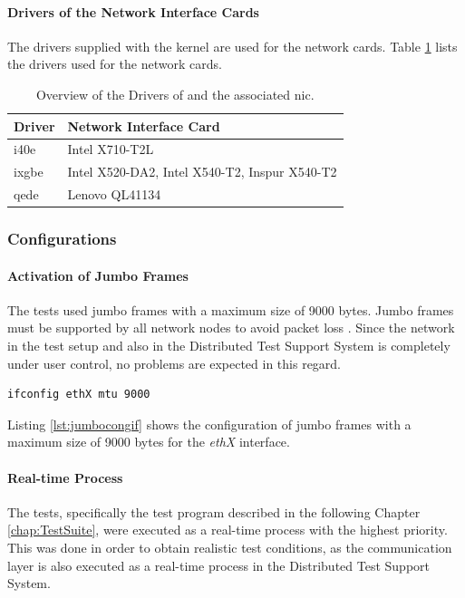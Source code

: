 \paragraph{Drivers of the Network Interface Cards}

The drivers supplied with the kernel are used for the network cards. Table \ref{tab:drivernic} lists the drivers used for the network cards.

\begin{table}[h]
\centering
\begin{tabular}{l|l}
	\toprule
	\textbf{Driver} & \textbf{Network Interface Card}\\
	\midrule
	i40e & Intel X710-T2L\\
	ixgbe & Intel X520-DA2, Intel X540-T2, Inspur X540-T2 \\
	qede & Lenovo QL41134\\
	\bottomrule
\end{tabular}
\caption{Overview of the Drivers of and the associated \ac{nic}.}
\label{tab:drivernic}
\end{table}

\subsubsection{Configurations}

\paragraph{Activation of Jumbo Frames}

The tests used jumbo frames with a maximum size of 9000 bytes. Jumbo frames must be supported by all network nodes to avoid packet loss \cite{swsetup04}. Since the network in the test setup and also in the Distributed Test Support System is completely under user control, no problems are expected in this regard. \\

\begin{lstlisting}[language=Bash, caption=Configuration of Jumbo Frames for the ethX Interface., label=lst:jumbocongif]
ifconfig ethX mtu 9000
\end{lstlisting}

Listing \ref{lst:jumbocongif} shows the configuration of jumbo frames with a maximum size of 9000 bytes for the \textit{ethX} interface.


\paragraph{Real-time Process} \label{chap:RTProcess}
The tests, specifically the test program described in the following Chapter \ref{chap:TestSuite}, were executed as a real-time process with the highest priority. This was done in order to obtain realistic test conditions, as the communication layer is also executed as a real-time process in the Distributed Test Support System. \\


